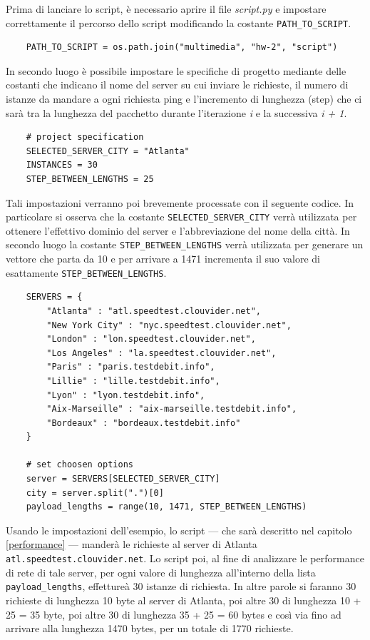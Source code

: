 Prima di lanciare lo script, è necessario aprire il file \textsl{script.py} e impostare correttamente il percorso dello script modificando la costante \texttt{PATH\_TO\_SCRIPT}.
\begin{lstlisting}
    PATH_TO_SCRIPT = os.path.join("multimedia", "hw-2", "script")
\end{lstlisting}

\noindent In secondo luogo è possibile impostare le specifiche di progetto mediante delle costanti che indicano il nome del server su cui inviare le richieste, il numero di istanze da mandare a ogni richiesta ping e l'incremento di lunghezza (step) che ci sarà tra la lunghezza del pacchetto durante l'iterazione \textit{i} e la successiva \textit{i + 1}.

\begin{lstlisting}
    # project specification
    SELECTED_SERVER_CITY = "Atlanta"
    INSTANCES = 30
    STEP_BETWEEN_LENGTHS = 25
\end{lstlisting}

\noindent Tali impostazioni verranno poi brevemente processate con il seguente codice. In particolare si osserva che la costante \texttt{SELECTED\_SERVER\_CITY} verrà utilizzata per ottenere l'effettivo dominio del server e l'abbreviazione del nome della città. In secondo luogo la costante \texttt{STEP\_BETWEEN\_LENGTHS} verrà utilizzata per generare un vettore che parta da 10 e per arrivare a 1471 incrementa il suo valore di esattamente \texttt{STEP\_BETWEEN\_LENGTHS}.

\begin{lstlisting}
    SERVERS = {
        "Atlanta" : "atl.speedtest.clouvider.net",
        "New York City" : "nyc.speedtest.clouvider.net", 
        "London" : "lon.speedtest.clouvider.net", 
        "Los Angeles" : "la.speedtest.clouvider.net", 
        "Paris" : "paris.testdebit.info", 
        "Lillie" : "lille.testdebit.info", 
        "Lyon" : "lyon.testdebit.info", 
        "Aix-Marseille" : "aix-marseille.testdebit.info", 
        "Bordeaux" : "bordeaux.testdebit.info"
    }

    # set choosen options
    server = SERVERS[SELECTED_SERVER_CITY]
    city = server.split(".")[0]
    payload_lengths = range(10, 1471, STEP_BETWEEN_LENGTHS)
\end{lstlisting}

\noindent Usando le impostazioni dell'esempio, lo script — che sarà descritto nel capitolo\,\ref{performance} — manderà le richieste al server di Atlanta \texttt{atl.speedtest.clouvider.net}. Lo script poi, al fine di analizzare le performance di rete di tale server, per ogni valore di lunghezza all'interno della lista \texttt{payload\_lengths}, effettureà 30 istanze di richiesta. In altre parole si faranno 30 richieste di lunghezza 10 byte al server di Atlanta, poi altre 30 di lunghezza 10 + 25 = 35 byte, poi altre 30 di lunghezza 35 + 25 = 60 bytes e così via fino ad arrivare alla lunghezza 1470 bytes, per un totale di 1770 richieste.



